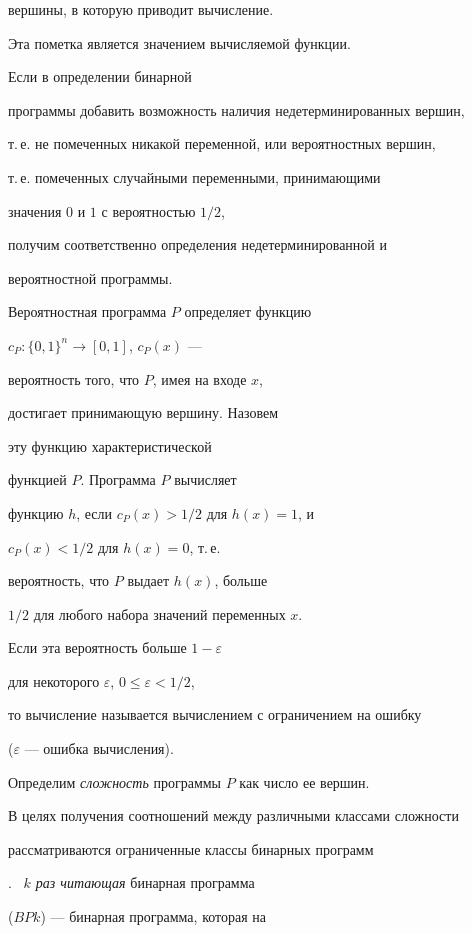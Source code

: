 вершины, в которую приводит вычисление.


Эта пометка является значением вычисляемой функции.





Если в определении бинарной


программы добавить возможность наличия недетерминированных вершин,


т.\,е. не помеченных никакой переменной, или вероятностных вершин,


т.\,е. помеченных случайными переменными, принимающими


значения $0$ и $1$ с вероятностью $1/2$,


получим соответственно определения недетерминированной и


вероятностной программы.


Вероятностная программа $P$ определяет функцию


$c_P: \{0,1\}^n \to [0,1]$, $c_P(x)$ ---


вероятность того, что $P$, имея на входе $x$,


достигает принимающую вершину. Назовем


эту функцию характеристической 


функцией $P$. Программа $P$ вычисляет


функцию $h$, если  $c_P(x)>1/2$ для $h(x)=1$, и


$c_P(x)<1/2$ для $h(x)=0$, т.\,е.


вероятность, что $P$ выдает $h(x)$, больше


$1/2$ для любого набора значений переменных $x$.


Если эта вероятность больше $1-\varepsilon$


для некоторого $\varepsilon$, $0\leq \varepsilon <1/2$,


то вычисление называется вычислением с ограничением на ошибку


($\varepsilon$ --- ошибка вычисления).





Определим {\em сложность} программы $P$ как число ее вершин.


В целях получения соотношений между различными классами сложности


рассматриваются ограниченные классы бинарных программ


\cite{W00}. \ {\em $k$ раз читающая} бинарная программа


($BPk$) --- бинарная программа, которая на


